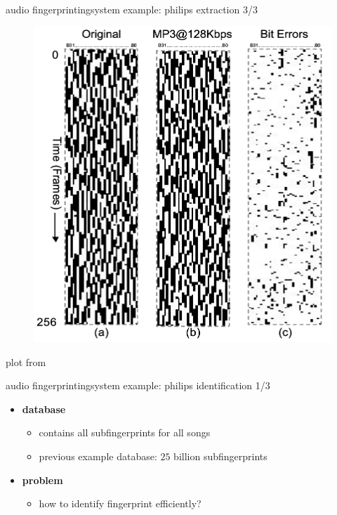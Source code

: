         \begin{frame}{audio fingerprinting}{system example: philips extraction 3/3}
            \vspace{-2mm}
            \begin{figure}
                \centering
                \includegraphics[scale=.25]{graph/fingerprint_example}
            \end{figure}
            \vspace{-10mm}plot from 
        \end{frame}
        
        \begin{frame}{audio fingerprinting}{system example: philips identification 1/3}
            \begin{itemize}
                \item	\textbf{database}
                    \begin{itemize}
                        \item	contains all subfingerprints for all songs
                        \item<2->	previous example database: $25$ billion subfingerprints
                        \bigskip
                    \end{itemize}
                \item<3->	\textbf{problem}
                    \begin{itemize}
                        \item how to identify fingerprint efficiently?
                    \end{itemize}
            \end{itemize}
        \end{frame}
        
